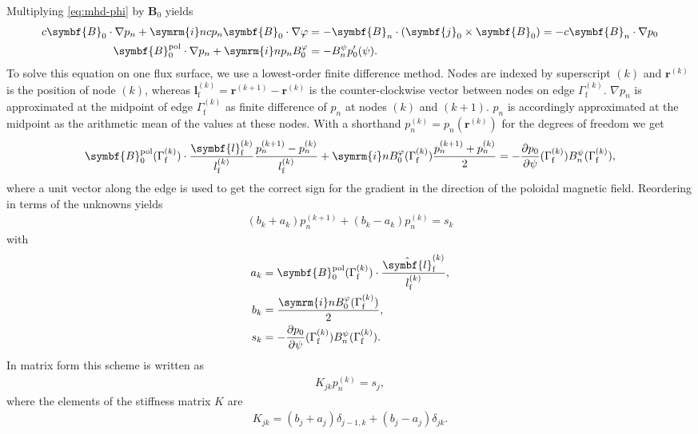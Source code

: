 \documentclass[a4paper, 10pt, english]{article}
\let\temp\varrho
\let\varrho\rho
\let\rho\temp
\let\temp\vartheta
\let\vartheta\theta
\let\theta\temp
\let\temp\varphi
\let\varphi\phi
\let\phi\temp
\let\vec\symbf
\newcommand*\im{\ensuremath{\symrm{i}}}  %
\newcommand*\pd[2][]{\ensuremath{\frac{\partial #1}{\partial #2}}}  %
\newcommand*\pol{\ensuremath{\textrm{pol}}}  %
\newcommand*\fs{\ensuremath{\textrm{f}}}  %
\begin{document}
Multiplying \cref{eq:mhd-phi} by $\vec{B}_{0}$ yields
\begin{align}
  c \vec{B}_{0} \cdot \nabla p_{n} + \im n c p_{n} \vec{B}_{0} \cdot \nabla \phi &= -\vec{B}_{n} \cdot (\vec{j}_{0} \times \vec{B}_{0}) = -c \vec{B}_{n} \cdot \nabla p_{0} \nonumber \\
  \vec{B}_{0}^{\pol} \cdot \nabla p_{n} + \im n p_{n} B_{0}^{\phi} &= -B_{n}^{\psi} p_{0}'(\psi). \label{eq:pn}
\end{align}
To solve this equation on one flux surface, we use a lowest-order finite difference method. Nodes are indexed by superscript $(k)$ and $\vec{r}^{(k)}$ is the position of node $(k)$, whereas $\vec{l}_{\fs}^{(k)} = \vec{r}^{(k+1)} - \vec{r}^{(k)}$ is the counter-clockwise vector between nodes on edge $\Gamma_{\fs}^{(k)}$. $\nabla p_{n}$ is approximated at the midpoint of edge $\Gamma_{\fs}^{(k)}$ as finite difference of $p_{n}$ at nodes $(k)$ and $(k+1)$. $p_{n}$ is accordingly approximated at the midpoint as the arithmetic mean of the values at these nodes. With a shorthand $p_{n}^{(k)} = p_{n} (\vec{r}^{(k)})$ for the degrees of freedom we get
\begin{gather}
  \vec{B}_{0}^{\pol} (\Gamma_{\fs}^{(k)}) \cdot \frac{\vec{l}_{\fs}^{(k)}}{l_{\fs}^{(k)}} \frac{p_{n}^{(k+1)} - p_{n}^{(k)}}{l_{\fs}^{(k)}} + \im n B_{0}^{\phi} (\Gamma_{\fs}^{(k)}) \frac{p_{n}^{(k+1)} + p_{n}^{(k)}}{2} = -\pd[p_{0}]{\psi} (\Gamma_{\fs}^{(k)}) B_{n}^{\psi} (\Gamma_{\fs}^{(k)}),
\end{gather}
where a unit vector along the edge is used to get the correct sign for the gradient in the direction of the poloidal magnetic field. Reordering in terms of the unknowns yields
\begin{gather}
  (b_{k} + a_{k}) p_{n}^{(k+1)} + (b_{k} - a_{k}) p_{n}^{(k)} = s_{k}
\end{gather}
with
\begin{align}
  a_{k} &= \vec{B}_{0}^{\pol} (\Gamma_{\fs}^{(k)}) \cdot \frac{\hat{\vec{l}}_{\fs}^{(k)}}{l_{\fs}^{(k)}}, \\
  b_{k} &= \frac{\im n B_{0}^{\phi} (\Gamma_{\fs}^{(k)})}{2}, \\
  s_{k} &= -\pd[p_{0}]{\psi} (\Gamma_{\fs}^{(k)}) B_{n}^{\psi} (\Gamma_{\fs}^{(k)}).
\end{align}
In matrix form this scheme is written as
\begin{gather}
  K_{jk} p_{n}^{(k)} = s_{j},
\end{gather}
where the elements of the stiffness matrix $K$ are
\begin{gather}
  K_{jk} = (b_{j} + a_{j}) \delta_{j-1, k} + (b_{j} - a_{j}) \delta_{jk}.
\end{gather}
\end{document}
